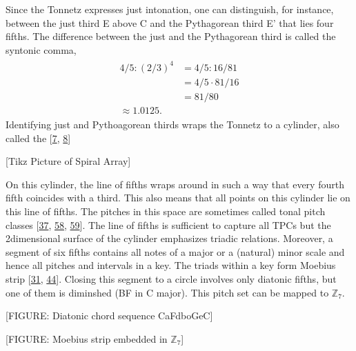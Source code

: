 \documentclass[letterpaper,10pt,english]{sphinxmanual}
\begin{document}
\sphinxAtStartPar
Since the Tonnetz expresses just intonation, one can distinguish, for
instance, between the just third E above C and the Pythagorean third E’
that lies four fifths. The difference between the just and the
Pythagorean third is called the syntonic comma,
\begin{equation*}
\begin{split}\begin{aligned}
    4/5 : (2/3)^4 &= 4/5 : 16/81\\
                                &= 4/5 \cdot 81/16\\
                                &= 81/80 \\
                                \approx 1.0125.\end{aligned}\end{split}
\end{equation*}
\sphinxAtStartPar
Identifying just and Pythoagorean thirds wraps the Tonnetz to a
cylinder, also called the 
{[}\hyperlink{cite.8_bibliography:id41}{7}, \hyperlink{cite.8_bibliography:id43}{8}{]}

\sphinxAtStartPar
{[}Tikz Picture of Spiral Array{]}

\sphinxAtStartPar
On this cylinder, the line of fifths wraps around in such a way that
every fourth fifth coincides with a third. This also means that all
points on this cylinder lie on this line of fifths. The pitches in this
space are sometimes called tonal pitch classes
{[}\hyperlink{cite.8_bibliography:id44}{37}, \hyperlink{cite.8_bibliography:id40}{58}, \hyperlink{cite.8_bibliography:id31}{59}{]}.
The line of
fifths is sufficient to capture all TPCs but the 2\sphinxhyphen{}dimensional surface
of the cylinder emphasizes triadic relations. Moreover, a segment of six
fifths contains all notes of a major or a (natural) minor scale and
hence all pitches and intervals in a key. The triads within a key form
Moebius strip {[}\hyperlink{cite.8_bibliography:id45}{31}, \hyperlink{cite.8_bibliography:id42}{44}{]}.
Closing this segment to a circle involves only diatonic fifths, but one of them is
diminshed (B\textendash{}F in C major). This pitch set can be mapped to
\(\mathbb Z_7\).

\sphinxAtStartPar
{[}FIGURE: Diatonic chord sequence C\sphinxhyphen{}a\sphinxhyphen{}F\sphinxhyphen{}d\sphinxhyphen{}bo\sphinxhyphen{}G\sphinxhyphen{}e\sphinxhyphen{}C{]}

\sphinxAtStartPar
{[}FIGURE: Moebius strip embedded in \(\mathbb Z_7\){]}
\end{document}
